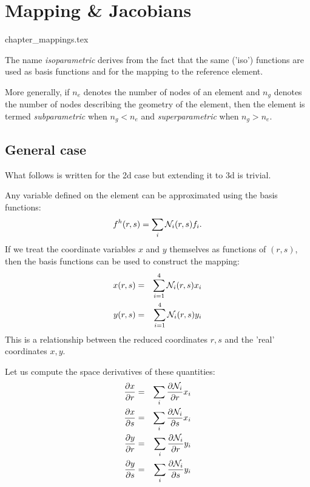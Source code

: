 \chapter{Mapping \& Jacobians} \label{ss:mappings} %

\begin{flushright} {\tiny {\color{gray} chapter\_mappings.tex}} \end{flushright}


The name {\sl isoparametric} derives from the fact that the same ('iso') 
functions are used as basis functions and for the mapping to the reference element.

More generally, if $n_e$ denotes the number of nodes of an element and $n_g$ denotes the 
number of nodes describing the geometry of the element, 
then the element is termed {\sl subparametric} when $n_g<n_e$ and 
{\sl superparametric} when $n_g>n_e$.

\section{General case}

What follows is written for the 2d case but extending it to 3d is trivial.

Any variable defined on the element can be approximated using the basis functions:
\begin{equation}
f^h(r,s)=\sum_i {\mathcal{N}}_i(r,s) f_i.
\end{equation}
If we treat the coordinate variables $x$ and $y$ themselves as functions of $(r,s)$, 
then the basis functions can be used to construct the mapping:
\begin{eqnarray}
x(r,s) &=& \sum_{i=1}^4 {\mathcal{N}}_i(r,s) x_i \\
y(r,s) &=& \sum_{i=1}^4 {\mathcal{N}}_i(r,s) y_i 
\end{eqnarray}
This is a relationship between the reduced coordinates $r,s$ and the 'real'
coordinates $x,y$.

Let us compute the space derivatives of these quantities:
\begin{eqnarray}
\frac{\partial x}{\partial r} &=& \sum_i \frac{\partial {\mathcal{N}}_i}{\partial r} x_i \nonumber\\
\frac{\partial x}{\partial s} &=& \sum_i \frac{\partial {\mathcal{N}}_i}{\partial s} x_i \nonumber\\
\frac{\partial y}{\partial r} &=& \sum_i \frac{\partial {\mathcal{N}}_i}{\partial r} y_i \nonumber\\
\frac{\partial y}{\partial s} &=& \sum_i \frac{\partial {\mathcal{N}}_i}{\partial s} y_i \nonumber
\end{eqnarray}

